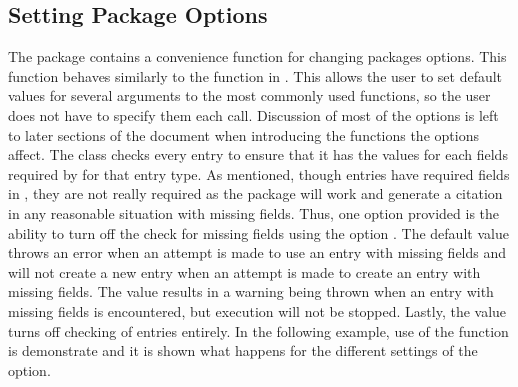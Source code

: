 \documentclass[article]{jss}\usepackage[]{graphicx}\usepackage[]{color}
\begin{document}
\subsection{Setting Package Options}
The package contains a convenience function  for changing packages options.  This function behaves similarly to the  function in .  This allows the user to set default values for several arguments to the most commonly used functions, so the user does not have to specify them each call.  Discussion of most of the options is left to later sections of the document when introducing the functions the options affect.  The  class checks every entry to ensure that it has the values for each fields required by \Bibtex{} for that entry type.  As mentioned, though entries have required fields in \Biblatex{}, they are not really required as the package will work and generate a citation in any reasonable situation with missing fields.  Thus, one option provided is the ability to turn off the check for missing fields using the option .  The default value  throws an error when an attempt is made to use an entry with missing fields and will not create a new entry when an attempt is made to create an entry with missing fields.  The value  results in a warning being thrown when an entry with missing fields is encountered, but execution will not be stopped.  Lastly, the value  turns off checking of entries entirely.  In the following example, use of the  function is demonstrate and it is shown what happens for the different settings of the  option.
\end{document}
